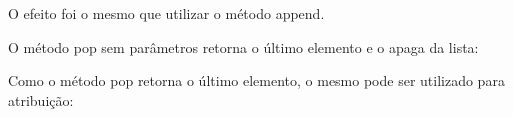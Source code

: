 \documentclass[letterpaper,10pt,brazil]{sphinxmanual}
\begin{document}
\begin{sphinxVerbatim}[commandchars=\\\{\}]
\end{sphinxVerbatim}

O efeito foi o mesmo que utilizar o método append.

O método pop sem parâmetros retorna o último elemento e o apaga da lista:

\begin{sphinxVerbatim}[commandchars=\\\{\}]
\end{sphinxVerbatim}

\begin{sphinxVerbatim}[commandchars=\\\{\}]
\end{sphinxVerbatim}

\begin{sphinxVerbatim}[commandchars=\\\{\}]
\end{sphinxVerbatim}

\begin{sphinxVerbatim}[commandchars=\\\{\}]
\end{sphinxVerbatim}

Como o método pop retorna o último elemento, o mesmo pode ser utilizado para atribuição:

\begin{sphinxVerbatim}[commandchars=\\\{\}]
  
\end{sphinxVerbatim}

\begin{sphinxVerbatim}[commandchars=\\\{\}]
\end{sphinxVerbatim}
\end{document}
